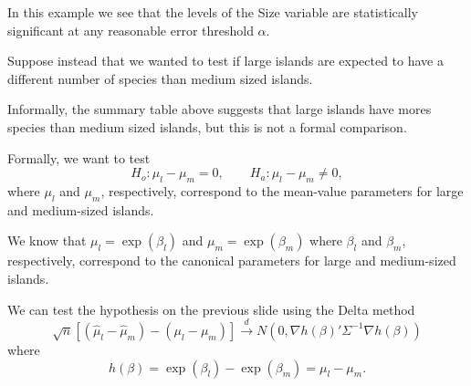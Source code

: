 \documentclass[
  ignorenonframetext,
]{beamer}
\begin{document}
\begin{frame}{}
\protect\hypertarget{section-14}{}
In this example we see that the levels of the Size variable are
statistically significant at any reasonable error threshold \(\alpha\).

\vspace{12pt}

Suppose instead that we wanted to test if large islands are expected to
have a different number of species than medium sized islands.

\vspace{12pt}

Informally, the summary table above suggests that large islands have
mores species than medium sized islands, but this is not a formal
comparison.

\vspace{12pt}

Formally, we want to test \[
  H_o: \mu_l - \mu_m = 0, \qquad H_a: \mu_l - \mu_m \neq 0,
\] where \(\mu_l\) and \(\mu_m\), respectively, correspond to the
mean-value parameters for large and medium-sized islands.
\end{frame}

\begin{frame}{}
\protect\hypertarget{section-15}{}
We know that \(\mu_l = \exp(\beta_l)\) and \(\mu_m = \exp(\beta_m)\)
where \(\beta_l\) and \(\beta_m\), respectively, correspond to the
canonical parameters for large and medium-sized islands.

\vspace{12pt}

We can test the hypothesis on the previous slide using the Delta method
\[
  \sqrt{n}\left[ (\hat\mu_l - \hat\mu_m) - (\mu_l - \mu_m)  \right] 
    \overset{d}{\to} N\left(0, \nabla h(\beta)'\Sigma^{-1}\nabla h(\beta)\right)
\] where \[
  h(\beta) = \exp(\beta_l) - \exp(\beta_m) = \mu_l - \mu_m.
\]
\end{frame}
\end{document}

